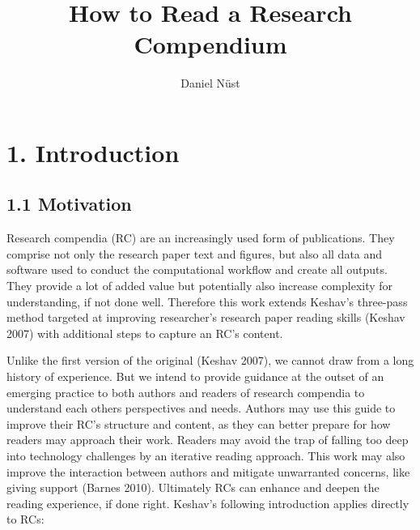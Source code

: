 \documentclass[fleqn,10pt]{wlpeerj} %
\title{How to Read a Research Compendium}
\author[1]{Daniel Nüst}
\affil[1]{Institute for Geoinformatics, University of Münster, Münster, Germany}
\begin{document}
\flushbottom
\maketitle
\thispagestyle{empty}

\section*{1. Introduction}\label{introduction}

\subsection*{1.1 Motivation}\label{motivation}

Research compendia (RC) are an increasingly used form of publications.
They comprise not only the research paper text and figures, but also all
data and software used to conduct the computational workflow and create
all outputs. They provide a lot of added value but potentially also
increase complexity for understanding, if not done well. Therefore this
work extends Keshav's three-pass method targeted at improving
researcher's research paper reading skills (Keshav 2007) with additional
steps to capture an RC's content.

Unlike the first version of the original (Keshav 2007), we cannot draw
from a long history of experience. But we intend to provide guidance at
the outset of an emerging practice to both authors and readers of
research compendia to understand each others perspectives and needs.
Authors may use this guide to improve their RC's structure and content,
as they can better prepare for how readers may approach their work.
Readers may avoid the trap of falling too deep into technology
challenges by an iterative reading approach. This work may also improve
the interaction between authors and mitigate unwarranted concerns, like
giving support (Barnes 2010). Ultimately RCs can enhance and deepen the
reading experience, if done right. Keshav's following introduction
applies directly to RCs:
\end{document}
